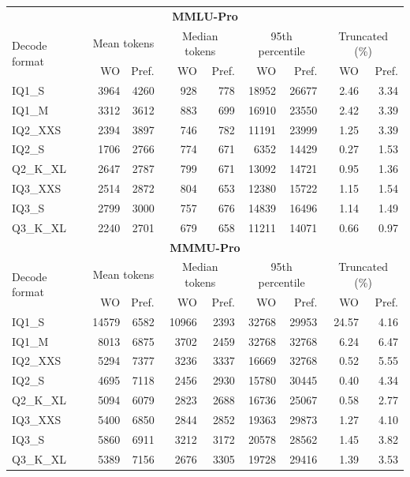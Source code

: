 \begin{tabular}{l|rr|rr|rr|rr}
\toprule
\multicolumn{9}{c}{\textbf{MMLU-Pro}} \\
\multirow{2}{*}{Decode format} & \multicolumn{2}{c|}{Mean tokens} & \multicolumn{2}{c|}{Median tokens} & \multicolumn{2}{c|}{95th percentile} & \multicolumn{2}{c}{Truncated (\%)} \\
 & WO & Pref. & WO & Pref. & WO & Pref. & WO & Pref. \\
\midrule
IQ1\_S & 3964 & 4260 & 928 & 778 & 18952 & 26677 & 2.46 & 3.34 \\
IQ1\_M & 3312 & 3612 & 883 & 699 & 16910 & 23550 & 2.42 & 3.39 \\
IQ2\_XXS & 2394 & 3897 & 746 & 782 & 11191 & 23999 & 1.25 & 3.39 \\
IQ2\_S & 1706 & 2766 & 774 & 671 & 6352 & 14429 & 0.27 & 1.53 \\
Q2\_K\_XL & 2647 & 2787 & 799 & 671 & 13092 & 14721 & 0.95 & 1.36 \\
IQ3\_XXS & 2514 & 2872 & 804 & 653 & 12380 & 15722 & 1.15 & 1.54 \\
IQ3\_S & 2799 & 3000 & 757 & 676 & 14839 & 16496 & 1.14 & 1.49 \\
Q3\_K\_XL & 2240 & 2701 & 679 & 658 & 11211 & 14071 & 0.66 & 0.97 \\
\midrule
\multicolumn{9}{c}{\textbf{MMMU-Pro}} \\
\multirow{2}{*}{Decode format} & \multicolumn{2}{c|}{Mean tokens} & \multicolumn{2}{c|}{Median tokens} & \multicolumn{2}{c|}{95th percentile} & \multicolumn{2}{c}{Truncated (\%)} \\
 & WO & Pref. & WO & Pref. & WO & Pref. & WO & Pref. \\
\midrule
IQ1\_S & 14579 & 6582 & 10966 & 2393 & 32768 & 29953 & 24.57 & 4.16 \\
IQ1\_M & 8013 & 6875 & 3702 & 2459 & 32768 & 32768 & 6.24 & 6.47 \\
IQ2\_XXS & 5294 & 7377 & 3236 & 3337 & 16669 & 32768 & 0.52 & 5.55 \\
IQ2\_S & 4695 & 7118 & 2456 & 2930 & 15780 & 30445 & 0.40 & 4.34 \\
Q2\_K\_XL & 5094 & 6079 & 2823 & 2688 & 16736 & 25067 & 0.58 & 2.77 \\
IQ3\_XXS & 5400 & 6850 & 2844 & 2852 & 19363 & 29873 & 1.27 & 4.10 \\
IQ3\_S & 5860 & 6911 & 3212 & 3172 & 20578 & 28562 & 1.45 & 3.82 \\
Q3\_K\_XL & 5389 & 7156 & 2676 & 3305 & 19728 & 29416 & 1.39 & 3.53 \\
\bottomrule
\end{tabular}
